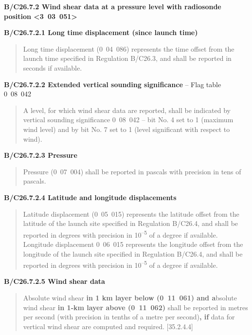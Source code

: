 \textbf{B/C26.7.2 Wind shear data at a pressure level with radiosonde position \textless3~03~051\textgreater{}}

\textbf{B/C26.7.2.1 Long time displacement (since launch time)}

\begin{quote}
Long time displacement (0~04~086) represents the time offset from the launch time specified in Regulation B/C26.3, and shall be reported in seconds if available.
\end{quote}

\textbf{B/C26.7.2.2 Extended vertical sounding significance} -- Flag table 0~08~042

\begin{quote}
A level, for which wind shear data are reported, shall be indicated by vertical sounding significance 0~08~042 -- bit No. 4 set to 1 (maximum wind level) and by bit No. 7 set to 1 (level significant with respect to wind).
\end{quote}

\textbf{B/C26.7.2.3 Pressure}

\begin{quote}
Pressure (0~07~004) shall be reported in pascals with precision in tens of pascals.
\end{quote}

\textbf{B/C26.7.2.4 Latitude and longitude displacements}

\begin{quote}
Latitude displacement (0~05~015) represents the latitude offset from the latitude of the launch site specified in Regulation B/C26.4, and shall be reported in degrees with precision in 10\textsuperscript{--5} of a degree if available. Longitude displacement 0~06~015 represents the longitude offset from the longitude of the launch site specified in Regulation B/C26.4, and shall be reported in degrees with precision in 10\textsuperscript{--5} of a degree if available.
\end{quote}

\textbf{B/C26.7.2.5 Wind shear data}

\begin{quote}
Absolute wind shear \textbf{in 1 km layer below (0~11~061) and a}bsolute wind shear \textbf{in 1‑km layer above (0~11~062)} shall be reported in metres per second (with precision in tenths of a metre per second)\textbf{, if} data for vertical wind shear are computed and required. {[}35.2.4.4{]}
\end{quote}


